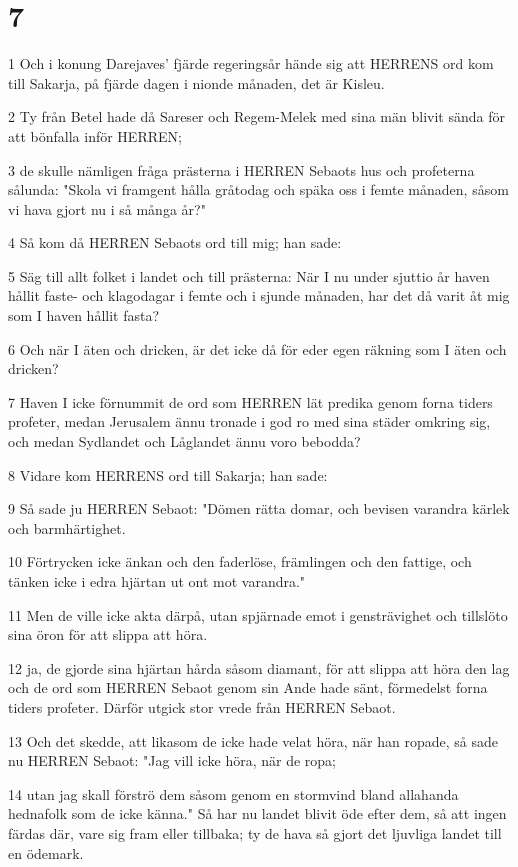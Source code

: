 \chapter{7}

\par 1 Och i konung Darejaves' fjärde regeringsår hände sig att HERRENS ord kom till Sakarja, på fjärde dagen i nionde månaden, det är Kisleu.
\par 2 Ty från Betel hade då Sareser och Regem-Melek med sina män blivit sända för att bönfalla inför HERREN;
\par 3 de skulle nämligen fråga prästerna i HERREN Sebaots hus och profeterna sålunda: "Skola vi framgent hålla gråtodag och späka oss i femte månaden, såsom vi hava gjort nu i så många år?"
\par 4 Så kom då HERREN Sebaots ord till mig; han sade:
\par 5 Säg till allt folket i landet och till prästerna: När I nu under sjuttio år haven hållit faste- och klagodagar i femte och i sjunde månaden, har det då varit åt mig som I haven hållit fasta?
\par 6 Och när I äten och dricken, är det icke då för eder egen räkning som I äten och dricken?
\par 7 Haven I icke förnummit de ord som HERREN lät predika genom forna tiders profeter, medan Jerusalem ännu tronade i god ro med sina städer omkring sig, och medan Sydlandet och Låglandet ännu voro bebodda?
\par 8 Vidare kom HERRENS ord till Sakarja; han sade:
\par 9 Så sade ju HERREN Sebaot: "Dömen rätta domar, och bevisen varandra kärlek och barmhärtighet.
\par 10 Förtrycken icke änkan och den faderlöse, främlingen och den fattige, och tänken icke i edra hjärtan ut ont mot varandra."
\par 11 Men de ville icke akta därpå, utan spjärnade emot i gensträvighet och tillslöto sina öron för att slippa att höra.
\par 12 ja, de gjorde sina hjärtan hårda såsom diamant, för att slippa att höra den lag och de ord som HERREN Sebaot genom sin Ande hade sänt, förmedelst forna tiders profeter. Därför utgick stor vrede från HERREN Sebaot.
\par 13 Och det skedde, att likasom de icke hade velat höra, när han ropade, så sade nu HERREN Sebaot: "Jag vill icke höra, när de ropa;
\par 14 utan jag skall förströ dem såsom genom en stormvind bland allahanda hednafolk som de icke känna." Så har nu landet blivit öde efter dem, så att ingen färdas där, vare sig fram eller tillbaka; ty de hava så gjort det ljuvliga landet till en ödemark.

